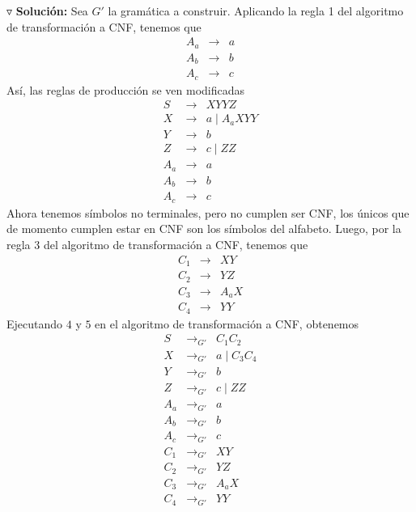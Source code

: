 \documentclass{article}
\begin{document}
\begin{enumerate}
    $\triangledown$ \textbf{Solución:}
    Sea $G'$ la gramática a construir. Aplicando la regla 1 del algoritmo de
    transformación a CNF, tenemos que
    \begin{eqnarray*}
      A_{a} &\rightarrow& a\\
      A_{b} &\rightarrow& b\\
      A_{c} &\rightarrow& c
    \end{eqnarray*}
    Así, las reglas de producción se ven modificadas
    \begin{eqnarray*}
      S &\rightarrow& XYYZ\\
      X &\rightarrow& a\; |\; A_aXYY\\
      Y &\rightarrow& b\\
      Z &\rightarrow& c\; |\; ZZ\\
      A_{a} &\rightarrow& a\\
      A_{b} &\rightarrow& b\\
      A_{c} &\rightarrow& c
    \end{eqnarray*}
    Ahora tenemos símbolos no terminales, pero no cumplen ser CNF, los
    únicos que de momento cumplen estar en CNF son los símbolos del alfabeto.
    Luego, por la regla $3$ del algoritmo de transformación a CNF, tenemos que
    \begin{eqnarray*}
      C_{1} &\rightarrow& XY\\
      C_{2} &\rightarrow& YZ\\
      C_{3} &\rightarrow& A_{a}X\\
      C_{4} &\rightarrow& YY
    \end{eqnarray*}
    Ejecutando $4$ y $5$ en el algoritmo de transformación a CNF, obtenemos
    \begin{eqnarray*}
      S &\rightarrow_{G'}& C_{1}C_{2}\\
      X &\rightarrow_{G'}& a\; |\; C_{3}C_{4}\\
      Y &\rightarrow_{G'}& b\\
      Z &\rightarrow_{G'}& c\; |\; ZZ\\
      A_{a} &\rightarrow_{G'}& a\\
      A_{b} &\rightarrow_{G'}& b\\
      A_{c} &\rightarrow_{G'}& c\\
      C_{1} &\rightarrow_{G'}& XY\\
      C_{2} &\rightarrow_{G'}& YZ\\
      C_{3} &\rightarrow_{G'}& A_{a}X\\
      C_{4} &\rightarrow_{G'}& YY

\end{eqnarray*}
\end{enumerate}
\end{document}
